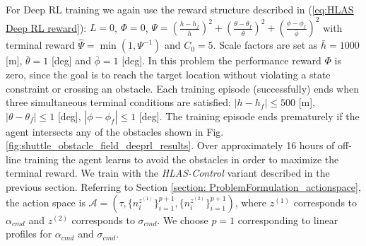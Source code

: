 \documentclass{UnderReview}
\begin{document}
For Deep RL training we again use the reward structure described in (\ref{eq:HLAS Deep RL reward}): $L=0$, $\Phi = 0$,  
$\Psi = \left(\frac{h-h_f}{\bar h}\right)^2 
		+ \left(\frac{\theta-\theta_f}{\bar \theta}\right)^2 
		+ \left(\frac{\phi-\phi_f}{\bar \phi}\right)^2 $
with terminal reward $\hat\Psi = \min\left(1, \Psi^{-1}\right)$ and $C_0 = 5$. Scale factors are set as $\bar h=1000$ [m], $\bar \theta=1$ [deg] and $\bar\phi=1$ [deg].  In this problem the performance reward $\Phi$ is zero, since the goal is to reach the target location without violating a state constraint or crossing an obstacle.   Each training episode (successfully) ends when three simultaneous terminal conditions are satisfied: $|h-h_f|\leq 500$ [m], $|\theta-\theta_f|\leq 1$ [deg], $|\phi-\phi_f| \leq 1$ [deg].  The training episode ends prematurely if the agent intersects any of the obstacles shown in Fig. \ref{fig:shuttle_obstacle_field_deeprl_results}.  Over approximately 16 hours of off-line training the agent learns to avoid the obstacles in order to maximize the terminal reward.  We train with the \textit{HLAS-Control} variant described in the previous section.  Referring to Section \ref{section: ProblemFormulation_actionspace}, the action space is $\mathcal{A}=(\tau, \{n^{z^{(1)}}_{i}\}_{i=1}^{p+1}, \{n^{z^{(2)}}_{i}\}_{i=1}^{p+1})$, where $z^{(1)}$ corresponds to $\alpha_{cmd}$ and $z^{(2)}$ corresponds to $\sigma_{cmd}$.  We choose $p=1$ corresponding to linear profiles for $\alpha_{cmd}$ and $\sigma_{cmd}$.  
\end{document}
